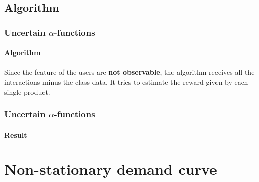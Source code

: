 \documentclass[11pt]{beamer}
\begin{document}

\subsection{Algorithm}


\begin{frame}
\frametitle{Uncertain $\alpha$-functions}
\framesubtitle{Algorithm}

Since the feature of the users are \textbf{not observable}, the algorithm receives all the interactions minus the class data.
It tries to estimate the reward given by each single product.

\end{frame}


\begin{frame}

\frametitle{Uncertain $\alpha$-functions}
\framesubtitle{Result}

\end{frame}






\AtBeginSection[]
{
\begin{frame}{}
    \tableofcontents[sections={\thesection}]
\end{frame}
}


\section{Non-stationary demand curve}
\end{document}
